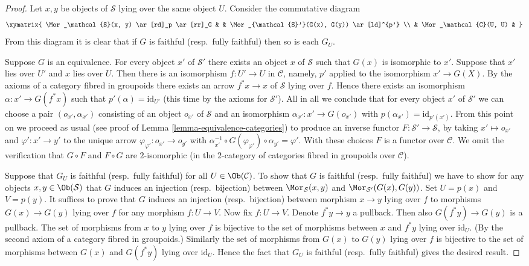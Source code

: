\begin{proof}
Let $x, y$ be objects of $\mathcal{S}$ lying over the same object $U$.
Consider the commutative diagram
$$
\xymatrix{
\Mor_\mathcal{S}(x, y) \ar[rd]_p \ar[rr]_G & &
\Mor_{\mathcal{S}'}(G(x), G(y)) \ar[ld]^{p'} \\
& \Mor_\mathcal{C}(U, U) &
}
$$
From this diagram it is clear that if $G$ is faithful (resp.\ fully faithful)
then so is each $G_U$.

\medskip\noindent
Suppose $G$ is an equivalence. For every object
$x'$ of $\mathcal{S}'$ there exists an object $x$ of $\mathcal{S}$
such that $G(x)$ is isomorphic to $x'$. Suppose that $x'$ lies
over $U'$ and $x$ lies over $U$. Then there is an isomorphism
$f : U' \to U$ in $\mathcal{C}$, namely, $p'$ applied to the
isomorphism $x' \to G(X)$. By the axioms of a category fibred
in groupoids there exists an arrow $f^*x \to x$ of $\mathcal{S}$
lying over $f$. Hence there exists an isomorphism
$\alpha : x' \to G(f^*x)$ such that $p'(\alpha) = \text{id}_{U'}$
(this time by the axioms for $\mathcal{S}'$). All in all we conclude
that for every object $x'$ of $\mathcal{S}'$ we can choose
a pair $(o_{x'}, \alpha_{x'})$ consisting of an object
$o_{x'}$ of $\mathcal{S}$ and an isomorphism $\alpha_{x'} : x' \to G(o_{x'})$
with $p(\alpha_{x'}) = \text{id}_{p'(x')}$.
From this point on we proceed as usual (see proof of
Lemma \ref{lemma-equivalence-categories}) to produce an inverse
functor $F : \mathcal{S}' \to \mathcal{S}$, by taking
$x' \mapsto o_{x'}$ and $\varphi' : x' \to y'$ to the unique
arrow $\varphi_{\varphi'} : o_{x'} \to o_{y'}$ with
$\alpha_{x'}^{-1} \circ G(\varphi_{\varphi'}) \circ \alpha_{y'}
= \varphi'$. With these choices $F$ is a functor over $\mathcal{C}$.
We omit the verification that $G \circ F$ and $F \circ G$ are
$2$-isomorphic (in the $2$-category of categories fibred in groupoids
over $\mathcal{C}$).

\medskip\noindent
Suppose that $G_U$ is faithful (resp.\ fully faithful)
for all $U\in\Ob(\mathcal C)$. To
show that $G$ is faithful (resp.\ fully faithful)
we have to show for any objects
$x, y\in\Ob(\mathcal{S})$ that $G$ induces an
injection (resp.\ bijection) between
$\Mor_\mathcal{S}(x, y)$ and
$\Mor_{\mathcal{S}'}(G(x), G(y))$.
Set $U = p(x)$ and $V = p(y)$.
It suffices to prove that $G$
induces an injection (resp.\ bijection) between morphism
$x \to y$ lying over $f$ to morphisms $G(x) \to G(y)$ lying over $f$
for any morphism $f : U \to V$.
Now fix $f : U \to V$. Denote $f^*y \to y$ a pullback.
Then also $G(f^*y) \to G(y)$ is a pullback.
The set of morphisms from $x$ to $y$ lying over $f$
is bijective to the set of morphisms between
$x$ and $f^*y$ lying over $\text{id}_U$. (By the second axiom
of a category fibred in groupoids.) Similarly
the set of morphisms from $G(x)$ to $G(y)$ lying over $f$
is bijective to the set of morphisms between
$G(x)$ and $G(f^*y)$ lying over $\text{id}_U$.
Hence the fact that $G_U$ is faithful (resp.\ fully faithful)
gives the desired result.


\end{proof}
